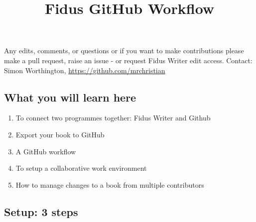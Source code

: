 \documentclass{article}
\begin{document}
\title{Fidus GitHub Workflow}

\maketitle


Any edits, comments, or questions or if you want to make contributions please make a pull request, raise an issue - or request Fidus Writer edit access. Contact: Simon Worthington, \href{https://github.com/mrchristian}{https://github.com/mrchristian}


\subsection{What you will learn here}\label{H8939544}


\begin{enumerate}
\item To connect two programmes together: Fidus Writer and Github


\item Export your book to GitHub


\item A GitHub workflow


\item To setup a collaborative work environment 


\item How to manage changes to a book from multiple contributors


\end{enumerate}

\subsection{Setup: 3 steps}\label{H1462292}
\end{document}
